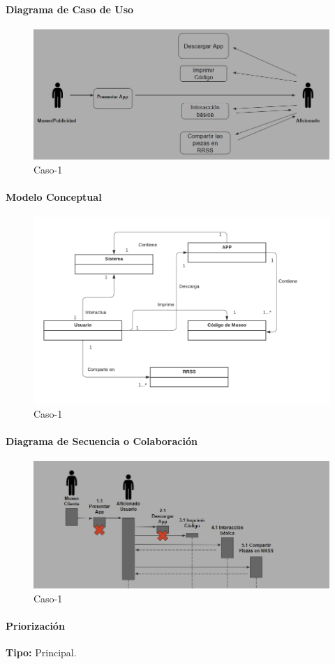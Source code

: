 \paragraph{Diagrama de Caso de Uso}

\begin{figure}[H]
\centerline{\includegraphics[width=15cm]{imgs/CasoUso_6.PNG}}
\caption{Caso-1}
\label{fig}
\end{figure}

\paragraph{Modelo Conceptual}

\begin{figure}[H]
\centerline{\includegraphics[width=15cm]{imgs/ModeloConceptualCaso_6_3.png}}
\caption{Caso-1}
\label{fig}
\end{figure}

\paragraph{Diagrama de Secuencia o Colaboración}

\begin{figure}[H]
\centerline{\includegraphics[width=15cm]{imgs/CasoUso_6_2.PNG}}
\caption{Caso-1}
\label{fig}
\end{figure}

\paragraph{Priorización}
{\textbf {Tipo:}}
Principal.